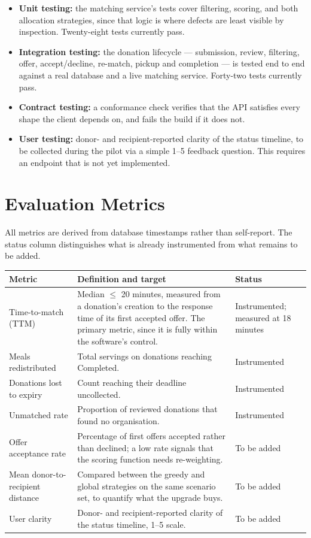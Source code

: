 \documentclass[12pt,a4paper]{report}
\begin{document}
\begin{itemize}[leftmargin=*]
    \item \textbf{Unit testing:} the matching service's tests cover filtering, scoring, and both allocation strategies, since that logic is where defects are least visible by inspection. Twenty-eight tests currently pass.
    \item \textbf{Integration testing:} the donation lifecycle --- submission, review, filtering, offer, accept/decline, re-match, pickup and completion --- is tested end to end against a real database and a live matching service. Forty-two tests currently pass.
    \item \textbf{Contract testing:} a conformance check verifies that the API satisfies every shape the client depends on, and fails the build if it does not.
    \item \textbf{User testing:} donor- and recipient-reported clarity of the status timeline, to be collected during the pilot via a simple 1--5 feedback question. This requires an endpoint that is not yet implemented.
\end{itemize}

\section{Evaluation Metrics}

All metrics are derived from database timestamps rather than self-report. The status column distinguishes what is already instrumented from what remains to be added.

\begin{longtable}{@{}p{3cm}p{7cm}p{2.5cm}@{}}
\toprule
\textbf{Metric} & \textbf{Definition and target} & \textbf{Status} \\
\midrule
\endhead
Time-to-match (TTM) & Median $\leq$ 20 minutes, measured from a donation's creation to the response time of its first accepted offer. The primary metric, since it is fully within the software's control. & Instrumented; measured at 18 minutes \\
Meals redistributed & Total servings on donations reaching Completed. & Instrumented \\
Donations lost to expiry & Count reaching their deadline uncollected. & Instrumented \\
Unmatched rate & Proportion of reviewed donations that found no organisation. & Instrumented \\
Offer acceptance rate & Percentage of first offers accepted rather than declined; a low rate signals that the scoring function needs re-weighting. & To be added \\
Mean donor-to-recipient distance & Compared between the greedy and global strategies on the same scenario set, to quantify what the upgrade buys. & To be added \\
User clarity & Donor- and recipient-reported clarity of the status timeline, 1--5 scale. & To be added \\
\bottomrule
\end{longtable}
\end{document}
